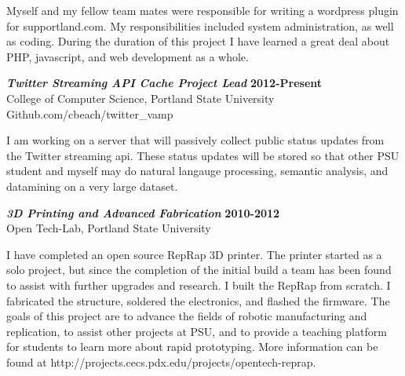 \documentclass[margin]{res}
\begin{document}
\begin{resume}
    Myself and my fellow team mates were responsible for writing a wordpress plugin 
    for supportland.com.  My responsibilities included system administration, as 
    well as coding.  During the duration of this project I have learned a great
    deal about PHP, javascript, and web development as a whole.

    {\sl \textbf{Twitter Streaming API Cache Project Lead}} \hfill \textbf{2012-Present} \\
    College of Computer Science, Portland State University \\
    Github.com/cbeach/twitter\_vamp 

    I am working on a server that will passively collect public status updates from the
    Twitter streaming api.  These status updates will be stored so that other PSU student
    and myself may do natural langauge processing, semantic analysis, and datamining on
    a very large dataset.				

    {\sl \textbf{3D Printing and Advanced Fabrication}} \hfill \textbf{2010-2012} \\
    Open Tech-Lab, Portland State University

    I have completed an open source RepRap 3D printer. The printer started as a solo project, 
    but since the completion of the initial build a team has been found to assist with further 
    upgrades and research.  I built the RepRap from scratch.  I fabricated the structure, soldered  
    the electronics, and flashed the firmware. 	The goals of this project are to advance the 
    fields of robotic manufacturing and replication, to assist other projects at PSU, and to 
    provide a teaching platform for students to learn more about rapid prototyping. 
    More information can be found at http://projects.cecs.pdx.edu/projects/opentech-reprap. 
	

\end{resume}
\end{document}
